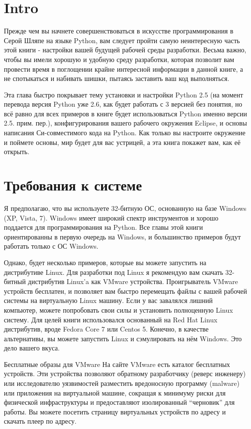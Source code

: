\documentclass[12pt]{book}
\begin{document}
\section*{Intro}

Прежде чем вы начнете совершенствоваться в искусстве программирования в Серой Шляпе на языке Python, вам следует пройти самую неинтересную часть этой книги - настройки вашей будущей рабочей среды разработки. Весьма важно, чтобы вы имели хорошую и удобную среду разработки, которая позволит вам провести время в поглощении крайне интересной информации в данной книге, а не спотыкаться и набивать шишки, пытаясь заставить ваш код выполняться.

Эта глава быстро покрывает тему установки и настройки Python 2.5 (на момент перевода версия Python уже 2.6, как будет работать с 3 версией без понятия, но всё равно для всех примеров в книге будет использоваться Python именно версии 2.5. прим. пер.), конфигурирования вашего рабочего окружения Eclipse, и основы написания Си-совместимого кода на Python. Как только вы настроите окружение и поймете основы, мир будет для вас устрицей, а эта книга покажет вам, как её открыть.

\section{Требования к системе}

Я предполагаю, что вы используете 32-битную ОС, основанную на базе Windows (XP, Vista, 7). Windows имеет широкий спектр инструментов и хорошо поддается для программирования на Python. Все главы этой книги ориентированны в первую очередь на Windows, и большинство примеров будут работать только с ОС Windows.

Однако, будет несколько примеров, которые вы можете запустить на дистрибутиве Linux. Для разработки под Linux я рекомендую вам скачать 32-битный дистрибутив Linux'a как VMware устройства. Проигрыватель VMware устройств бесплатен, и позволяет вам быстро перемещать файлы с вашей рабочей системы на виртуальную Linux машину. Если у вас завалялся лишний компьютер, можете попробовать свои силы и установить полноценную Linux систему. Для целей книги использовался основанный на Red Hat Linux дистрибутив, вроде Fedora Core 7 или Centos 5. Конечно, в качестве альтернативы, вы можете запустить Linux и сэмулировать на нём Windows. Это дело вашего вкуса.

\begin{Ovalbox}{Бесплатные образы для VMware}
На сайте VMware есть каталог бесплатных устройств. Эти устройства позволяют обратному разработчику (реверс инженеру) или исследователю уязвимостей разместить вредоносную программу (malware) или приложения на виртуальной машине, сокращая к минимуму риски для физической инфраструктуры и предоставляют изолированный ``черновик'' для работы. Вы можете посетить страницу виртуальных устройств по адресу и скачать плеер по адресу.
\end{Ovalbox}
\end{document}
